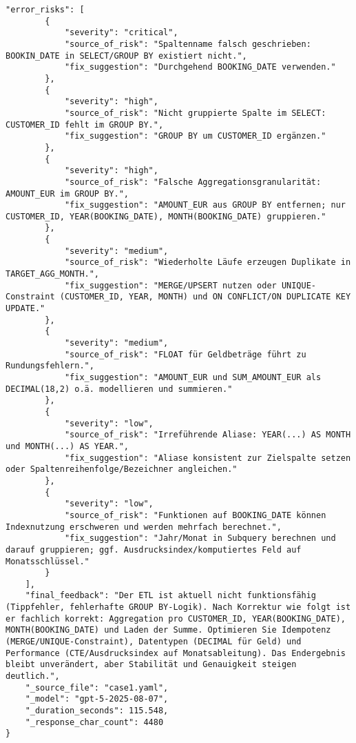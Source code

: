\begin{lstlisting}[caption={Ausgabe: GPT-5 Anwendungsfall 1 Hauptdurchlauf},label={gpt_case1_prompt1}]
    "error_risks": [
        {
            "severity": "critical",
            "source_of_risk": "Spaltenname falsch geschrieben: BOOKIN_DATE in SELECT/GROUP BY existiert nicht.",
            "fix_suggestion": "Durchgehend BOOKING_DATE verwenden."
        },
        {
            "severity": "high",
            "source_of_risk": "Nicht gruppierte Spalte im SELECT: CUSTOMER_ID fehlt im GROUP BY.",
            "fix_suggestion": "GROUP BY um CUSTOMER_ID ergänzen."
        },
        {
            "severity": "high",
            "source_of_risk": "Falsche Aggregationsgranularität: AMOUNT_EUR im GROUP BY.",
            "fix_suggestion": "AMOUNT_EUR aus GROUP BY entfernen; nur CUSTOMER_ID, YEAR(BOOKING_DATE), MONTH(BOOKING_DATE) gruppieren."
        },
        {
            "severity": "medium",
            "source_of_risk": "Wiederholte Läufe erzeugen Duplikate in TARGET_AGG_MONTH.",
            "fix_suggestion": "MERGE/UPSERT nutzen oder UNIQUE-Constraint (CUSTOMER_ID, YEAR, MONTH) und ON CONFLICT/ON DUPLICATE KEY UPDATE."
        },
        {
            "severity": "medium",
            "source_of_risk": "FLOAT für Geldbeträge führt zu Rundungsfehlern.",
            "fix_suggestion": "AMOUNT_EUR und SUM_AMOUNT_EUR als DECIMAL(18,2) o.ä. modellieren und summieren."
        },
        {
            "severity": "low",
            "source_of_risk": "Irreführende Aliase: YEAR(...) AS MONTH und MONTH(...) AS YEAR.",
            "fix_suggestion": "Aliase konsistent zur Zielspalte setzen oder Spaltenreihenfolge/Bezeichner angleichen."
        },
        {
            "severity": "low",
            "source_of_risk": "Funktionen auf BOOKING_DATE können Indexnutzung erschweren und werden mehrfach berechnet.",
            "fix_suggestion": "Jahr/Monat in Subquery berechnen und darauf gruppieren; ggf. Ausdrucksindex/komputiertes Feld auf Monatsschlüssel."
        }
    ],
    "final_feedback": "Der ETL ist aktuell nicht funktionsfähig (Tippfehler, fehlerhafte GROUP BY-Logik). Nach Korrektur wie folgt ist er fachlich korrekt: Aggregation pro CUSTOMER_ID, YEAR(BOOKING_DATE), MONTH(BOOKING_DATE) und Laden der Summe. Optimieren Sie Idempotenz (MERGE/UNIQUE-Constraint), Datentypen (DECIMAL für Geld) und Performance (CTE/Ausdrucksindex auf Monatsableitung). Das Endergebnis bleibt unverändert, aber Stabilität und Genauigkeit steigen deutlich.",
    "_source_file": "case1.yaml",
    "_model": "gpt-5-2025-08-07",
    "_duration_seconds": 115.548,
    "_response_char_count": 4480
}
\end{lstlisting}


